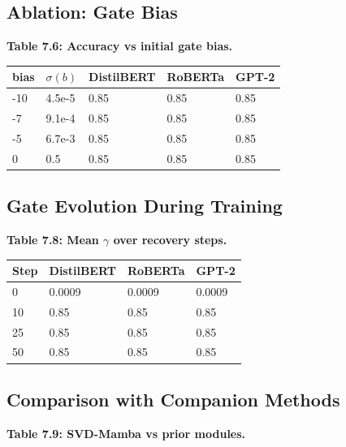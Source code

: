 \subsection{Ablation: Gate Bias}

\textbf{Table 7.6: Accuracy vs initial gate bias.}

\begin{table}[H]
\centering
\small
\begin{tabular}{lllll}
\toprule
\textbf{bias} & \textbf{$\sigma(b)$} & \textbf{DistilBERT} & \textbf{RoBERTa} & \textbf{GPT-2} \\
\midrule
-10 & 4.5e-5 & 0.85 & 0.85 & 0.85 \\
-7 & 9.1e-4 & 0.85 & 0.85 & 0.85 \\
-5 & 6.7e-3 & 0.85 & 0.85 & 0.85 \\
0 & 0.5 & 0.85 & 0.85 & 0.85 \\
\bottomrule
\end{tabular}
\end{table}

\subsection{Gate Evolution During Training}

\textbf{Table 7.8: Mean $\gamma$ over recovery steps.}

\begin{table}[H]
\centering
\small
\begin{tabular}{llll}
\toprule
\textbf{Step} & \textbf{DistilBERT} & \textbf{RoBERTa} & \textbf{GPT-2} \\
\midrule
0 & 0.0009 & 0.0009 & 0.0009 \\
10 & 0.85 & 0.85 & 0.85 \\
25 & 0.85 & 0.85 & 0.85 \\
50 & 0.85 & 0.85 & 0.85 \\
\bottomrule
\end{tabular}
\end{table}

\subsection{Comparison with Companion Methods}

\textbf{Table 7.9: SVD-Mamba vs prior modules.}

